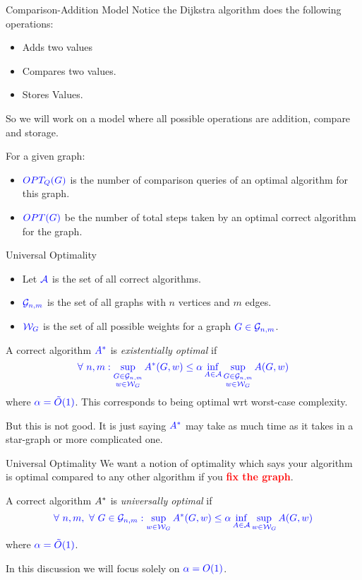 \documentclass[10pt]{beamer}
\begin{document}
\begin{frame}{Comparison-Addition Model}
	Notice the Dijkstra algorithm does the following operations: \begin{itemize}
		\item Adds two values
		\item Compares two values.
		\item Stores Values.
	\end{itemize}So we will work on a model where all possible operations are  addition, compare and storage. \vfill\pause

	For a given graph:
	\begin{itemize}
		\item $\mathcolor{blue}{OPT_Q(G)}$ is the number of comparison queries of an optimal algorithm for this graph.\vfill
		\item $\mathcolor{blue}{OPT(G)}$ be the number of total steps taken by an optimal correct algorithm for the graph.
	\end{itemize}

\end{frame}
\begin{frame}{Universal Optimality}
	\begin{itemize}
		\item Let $\mathcolor{blue}{\mathcal{A}}$ is the set of all correct algorithms.
		\item $\mathcolor{blue}{\mathcal{G}_{n,m}}$ is the set of all graphs with $n$ vertices and $m$ edges.
		\item $\mathcolor{blue}{\mathcal{W}_G}$ is the set of all possible weights for a graph $\mathcolor{blue}{G\in\mathcal{G}_{n,m}}$.
	\end{itemize} \pause\vfill
	A correct algorithm $\mathcolor{blue}{A^*}$ is \emph{existentially optimal} if $$\mathcolor{blue}{\forall\ n,m: \sup\limits_{\substack{G\in\mathcal{G}_{n,m}\\ w\in \mathcal{W}_G} }A^*(G,w)\leq \alpha\inf\limits_{A\in \mathcal{A}}\sup\limits_{\substack{G\in\mathcal{G}_{n,m}\\ w\in \mathcal{W}_G} } A(G,w)}$$ where $\mathcolor{blue}{\alpha=\tilde{O}(1)}$. This corresponds to being optimal wrt worst-case complexity.\pause  \vfill

	But this is not good. It is just saying $\mathcolor{blue}{A^*}$ may take as much time as it takes in a star-graph or more complicated one.
\end{frame}
\begin{frame}{Universal Optimality}
	We want a notion of optimality which says your algorithm is optimal compared to any other algorithm if you \textcolor{red}{\textbf{fix the graph}}.\pause  \vfill

	A correct algorithm $\mathcolor{blue}{}A^*$ is \emph{universally optimal} if$$\mathcolor{blue}{\forall\ n,m,\ \forall\ G\in \mathcal{G}_{n,m}: \sup\limits_{w\in \mathcal{W}_G} A^*(G,w)\leq \alpha\inf\limits_{A\in \mathcal{A}}\sup\limits_{w\in \mathcal{W}_G} A(G,w)}$$ where $\mathcolor{blue}{\alpha=\tilde{O}(1)}$.  \pause \vfill

	In this discussion we will focus solely on  $\mathcolor{blue}{\alpha=O(1)}$.
\end{frame}
\end{document}
